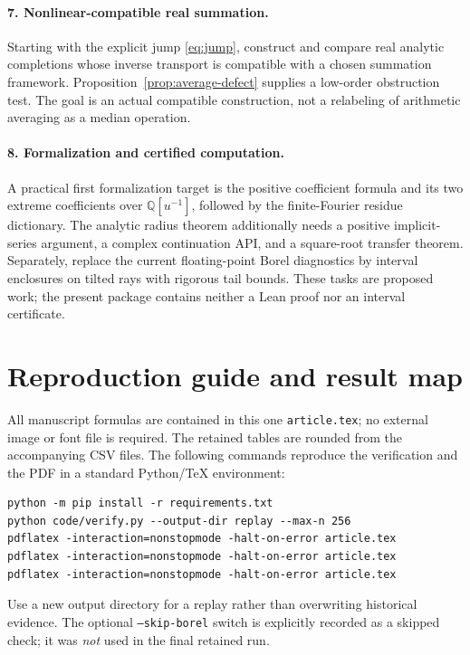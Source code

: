 \documentclass[11pt,a4paper]{article}
\theoremstyle{definition}\newtheorem{definition}[theorem]{Definition}
\theoremstyle{remark}\newtheorem{remark}[theorem]{Remark}
\newcommand{\Q}{\mathbb Q}
\numberwithin{equation}{section}
\begin{document}
\paragraph{7. Nonlinear-compatible real summation.}
Starting with the explicit jump \eqref{eq:jump}, construct and compare
real analytic completions whose inverse transport is compatible with a
chosen summation framework. Proposition~\ref{prop:average-defect} supplies
a low-order obstruction test. The goal is an actual compatible construction,
not a relabeling of arithmetic averaging as a median operation.

\paragraph{8. Formalization and certified computation.}
A practical first formalization target is the positive coefficient formula
and its two extreme coefficients over $\Q[u^{-1}]$, followed by the
finite-Fourier residue dictionary. The analytic radius theorem additionally
needs a positive implicit-series argument, a complex continuation API,
and a square-root transfer theorem. Separately, replace the current
floating-point Borel diagnostics by interval enclosures on tilted rays
with rigorous tail bounds. These tasks are proposed work; the present
package contains neither a Lean proof nor an interval certificate.

\appendix
\section{Reproduction guide and result map}\label{app:reproduce}

All manuscript formulas are contained in this one \texttt{article.tex};
no external image or font file is required. The retained tables are rounded
from the accompanying CSV files. The following commands reproduce the
verification and the PDF in a standard Python/TeX environment:
\begin{verbatim}
python -m pip install -r requirements.txt
python code/verify.py --output-dir replay --max-n 256
pdflatex -interaction=nonstopmode -halt-on-error article.tex
pdflatex -interaction=nonstopmode -halt-on-error article.tex
pdflatex -interaction=nonstopmode -halt-on-error article.tex
\end{verbatim}
Use a new output directory for a replay rather than overwriting historical
evidence. The optional \texttt{--skip-borel} switch is explicitly recorded
as a skipped check; it was \emph{not} used in the final retained run.
\end{document}
